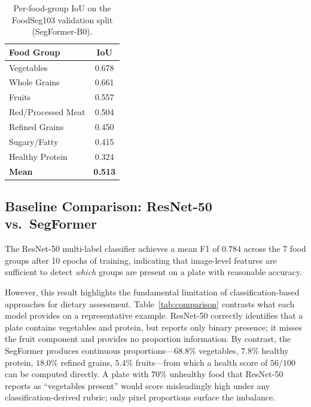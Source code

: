 \begin{table}[h]
\centering
\caption{Per-food-group IoU on the FoodSeg103 validation split (SegFormer-B0).}
\label{tab:group_iou}
\begin{tabular}{lc}
\toprule
Food Group & IoU \\
\midrule
Vegetables          & 0.678 \\
Whole Grains        & 0.661 \\
Fruits              & 0.557 \\
Red/Processed Meat  & 0.504 \\
Refined Grains      & 0.450 \\
Sugary/Fatty        & 0.415 \\
Healthy Protein     & 0.324 \\
\midrule
\textbf{Mean}       & \textbf{0.513} \\
\bottomrule
\end{tabular}
\end{table}

\subsection{Baseline Comparison: ResNet-50 vs.\ SegFormer}

The ResNet-50 multi-label classifier achieves a mean F1 of $0.784$ across the 7 food groups after 10 epochs of training, indicating that image-level features are sufficient to detect \emph{which} groups are present on a plate with reasonable accuracy.

However, this result highlights the fundamental limitation of classification-based approaches for dietary assessment.
Table~\ref{tab:comparison} contrasts what each model provides on a representative example.
ResNet-50 correctly identifies that a plate contains vegetables and protein, but reports only binary presence; it misses the fruit component and provides no proportion information.
By contrast, the SegFormer produces continuous proportions---$68.8\%$ vegetables, $7.8\%$ healthy protein, $18.0\%$ refined grains, $5.4\%$ fruits---from which a health score of $56/100$ can be computed directly.
A plate with $70\%$ unhealthy food that ResNet-50 reports as ``vegetables present'' would score misleadingly high under any classification-derived rubric; only pixel proportions surface the imbalance.

